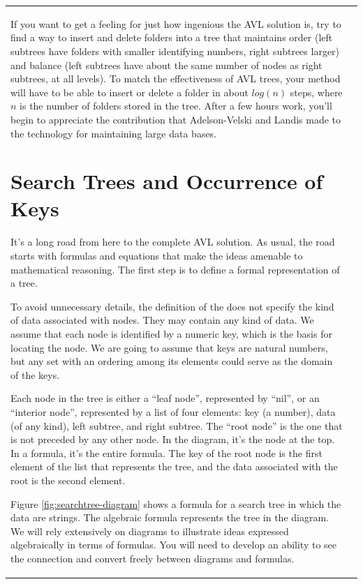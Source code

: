 \begin{tabular}{ll}
If you want to get a feeling for just how ingenious the AVL
solution is, try to find a way to insert and delete folders into a
tree that maintains order (left subtrees have folders with smaller
identifying numbers, right subtrees larger) and balance (left
subtrees have about the same number of nodes as right subtrees, at
all levels). To match the effectiveness of AVL trees, your method
will have to be able to insert or delete a folder in about
$log(n)$ steps, where $n$ is the number of folders stored
in the tree.
After a few hours work, you'll begin to appreciate
the contribution that Adelson-Velski and Landis made to the technology for
maintaining large data bases.

\section{Search Trees and Occurrence of Keys}

It's a long road from here to the complete AVL solution. As usual,
the road starts with formulas and equations that make the ideas
amenable to mathematical reasoning.
The first step is to define a formal representation of a tree.

To avoid unnecessary details, the definition of the
does not specify the kind of data associated with nodes.
They may contain any kind of data.
We assume that each node is identified by a numeric key,
which is the basis for locating the node.
We are going to assume that keys are natural numbers,
but any set with an ordering among its elements could serve
as the domain of the keys.

\label{leaf-node}
Each node in the tree is either a ``leaf node'', represented by ``nil'',
\label{interior-node}
or an ``interior node'', represented by a list of four elements:
key (a number), data (of any kind), left subtree, and right subtree.
\label{root-node}
The ``root node'' is the one that is not preceded by any other node.
In the diagram, it's the node at the top.
In a formula, it's the entire formula.
The key of the root node is the first element of the list that represents the tree,
and the data associated with the root is the second element.

Figure \ref{fig:searchtree-diagram} shows a formula
for a search tree in which the data are strings.
The algebraic formula represents the tree in the diagram.
We will rely extensively on diagrams to
illustrate ideas expressed algebraically in terms of formulas.
You will need to develop an ability to see the connection
and convert freely between diagrams and formulas.


\end{tabular}
